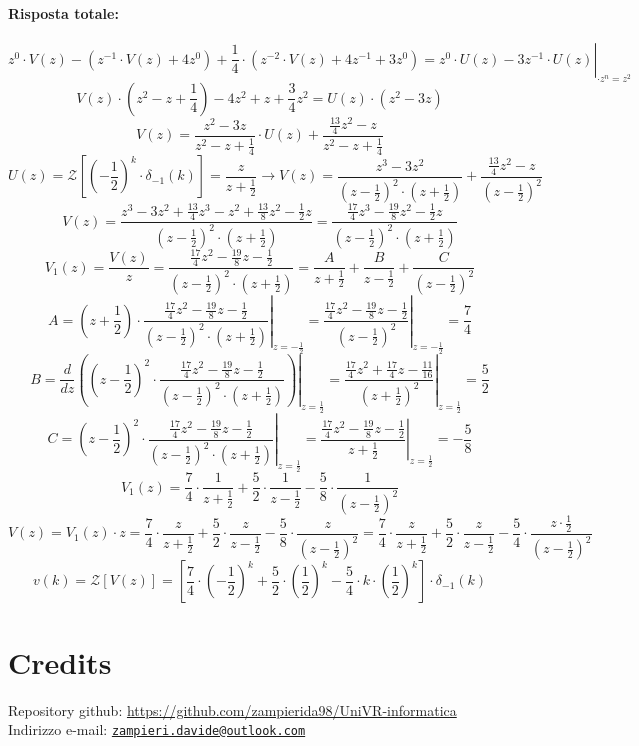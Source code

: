 \documentclass[a4paper]{article}
\newcommand{\mail}[1]{\href{mailto:#1}{\texttt{#1}}}
\begin{document}
	\paragraph{Risposta totale:}
	\[
	\left. z^0 \cdot V(z) - (z^{-1} \cdot V(z) + 4 z^0) + \frac{1}{4} \cdot (z^{-2} \cdot V(z) + 4 z^{-1} + 3 z^0) = z^0 \cdot U(z) - 3 z^{-1} \cdot U(z) \right|_{\cdot z^n = z^2}
	\]
	\[ V(z) \cdot \left( z^2 - z + \frac{1}{4} \right) -4z^2 + z + \frac{3}{4} z^2 = U(z) \cdot (z^2 - 3z) \]
	\[ V(z) = \frac{z^2 -3z}{z^2 - z + \frac{1}{4}} \cdot U(z) + \frac{\frac{13}{4} z^2 - z}{z^2 - z + \frac{1}{4}} \]
	\[
	U(z) = \mathcal{Z} \left[ \left( -\frac{1}{2} \right)^k \cdot \delta_{-1}(k) \right] = \frac{z}{z+\frac{1}{2}} 
	\longrightarrow
	V(z) = \frac{z^3 -3z^2}{(z-\frac{1}{2})^2 \cdot (z+\frac{1}{2})} + \frac{\frac{13}{4} z^2 - z}{(z-\frac{1}{2})^2}
	\]
	\[
	V(z) = \frac{z^3 -3z^2 + \frac{13}{4} z^3 - z^2 + \frac{13}{8} z^2 - \frac{1}{2} z}{(z-\frac{1}{2})^2 \cdot (z+\frac{1}{2})} 
	= \frac{\frac{17}{4} z^3 - \frac{19}{8} z^2 - \frac{1}{2} z}{(z-\frac{1}{2})^2 \cdot (z+\frac{1}{2})}
	\]
	\[
	V_1(z) = \frac{V(z)}{z} = \frac{\frac{17}{4} z^2 - \frac{19}{8} z - \frac{1}{2}}{(z-\frac{1}{2})^2 \cdot (z+\frac{1}{2})}
	= \frac{A}{z+\frac{1}{2}} + \frac{B}{z-\frac{1}{2}} + \frac{C}{(z-\frac{1}{2})^2}
	\]
	\[
	A = \left. \left( z+\frac{1}{2} \right) \cdot \frac{\frac{17}{4} z^2 - \frac{19}{8} z - \frac{1}{2}}{(z-\frac{1}{2})^2 \cdot (z+\frac{1}{2})} \right|_{z=-\frac{1}{2}} = \left. \frac{\frac{17}{4} z^2 - \frac{19}{8} z - \frac{1}{2}}{(z-\frac{1}{2})^2} \right|_{z=-\frac{1}{2}} = \frac{7}{4}
	\]
	\[
	B = \frac{d}{dz} \left. \left( \left( z-\frac{1}{2} \right)^2 \cdot \frac{\frac{17}{4} z^2 - \frac{19}{8} z - \frac{1}{2}}{(z-\frac{1}{2})^2 \cdot (z+\frac{1}{2})} \right) \right|_{z=\frac{1}{2}} = \left. \frac{\frac{17}{4} z^2 + \frac{17}{4} z - \frac{11}{16}}{(z+\frac{1}{2})^2} \right|_{z=\frac{1}{2}} = \frac{5}{2}
	\]
	\[
	C = \left. \left( z-\frac{1}{2} \right)^2 \cdot \frac{\frac{17}{4} z^2 - \frac{19}{8} z - \frac{1}{2}}{(z-\frac{1}{2})^2 \cdot (z+\frac{1}{2})} \right|_{z=\frac{1}{2}} = \left. \frac{\frac{17}{4} z^2 - \frac{19}{8} z - \frac{1}{2}}{z+\frac{1}{2}} \right|_{z=\frac{1}{2}} = -\frac{5}{8}
	\]
	\[ V_1(z) = \frac{7}{4} \cdot \frac{1}{z+\frac{1}{2}} + \frac{5}{2} \cdot \frac{1}{z-\frac{1}{2}} - \frac{5}{8} \cdot \frac{1}{(z-\frac{1}{2})^2} \]
	\[
	V(z) = V_1(z) \cdot z = \frac{7}{4} \cdot \frac{z}{z+\frac{1}{2}} + \frac{5}{2} \cdot \frac{z}{z-\frac{1}{2}} - \frac{5}{8} \cdot \frac{z}{(z-\frac{1}{2})^2}
	= \frac{7}{4} \cdot \frac{z}{z+\frac{1}{2}} + \frac{5}{2} \cdot \frac{z}{z-\frac{1}{2}} - \frac{5}{4} \cdot \frac{z \cdot \frac{1}{2}}{(z-\frac{1}{2})^2}
	\]
	\[
	v(k) = \mathcal{Z} [V(z)] = \left[ \frac{7}{4} \cdot \left( -\frac{1}{2} \right)^k + \frac{5}{2} \cdot \left( \frac{1}{2} \right)^k - \frac{5}{4} \cdot k \cdot \left( \frac{1}{2} \right)^k \right] \cdot \delta_{-1}(k)
	\]
	\newpage
	
	
	\section{Credits}
	Repository github: \url{https://github.com/zampierida98/UniVR-informatica} \\
	Indirizzo e-mail: \mail{zampieri.davide@outlook.com}
	
\end{document}
